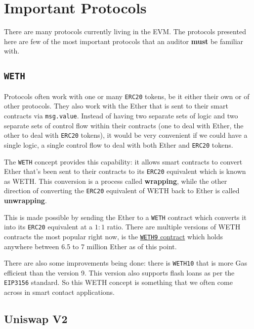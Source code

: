 \section{Important Protocols}\label{important-protocols}

There are many protocols currently living in the EVM. The protocols
presented here are few of the most important protocols that an auditor
\textbf{must} be familiar with.

\subsection{\texorpdfstring{\texttt{WETH}}{WETH}}\label{weth}

Protocols often work with one or many \texttt{ERC20} tokens, be it
either their own or of other protocols. They also work with the Ether
that is sent to their smart contracts via \texttt{msg.value}. Instead of
having two separate sets of logic and two separate sets of control flow
within their contracts (one to deal with Ether, the other to deal with
\texttt{ERC20} tokens), it would be very convenient if we could have a
single logic, a single control flow to deal with both Ether and
\texttt{ERC20} tokens.

The \texttt{WETH} concept provides this capability: it allows smart
contracts to convert Ether that's been sent to their contracts to its
\texttt{ERC20} equivalent which is known as WETH. This conversion is a
process called \textbf{wrapping}, while the other direction of
converting the \texttt{ERC20} equivalent of WETH back to Ether is called
\textbf{unwrapping}.

This is made possible by sending the Ether to a \texttt{WETH} contract
which converts it into its \texttt{ERC20} equivalent at a $1:1$ ratio.
There are multiple versions of WETH contracts the most popular right
now, is the
\href{https://etherscan.io/address/0xc02aaa39b223fe8d0a0e5c4f27ead9083c756cc2\#code}{\texttt{WETH9}
contract} which holds anywhere between 6.5 to 7 million Ether as of this
point.

There are also some improvements being done: there is \texttt{WETH10}
that is more Gas efficient than the version 9. This version also
supports flash loans as per the \texttt{EIP3156} standard. So this WETH
concept is something that we often come across in smart contact
applications.

\subsection{Uniswap V2}\label{uniswap-v2}

